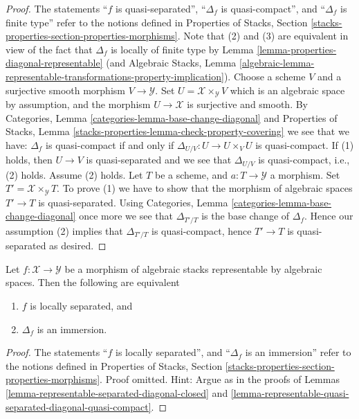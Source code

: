 \begin{proof}
The statements
``$f$ is quasi-separated'',
``$\Delta_f$ is quasi-compact'', and
``$\Delta_f$ is finite type''
refer to the notions defined in
Properties of Stacks,
Section \ref{stacks-properties-section-properties-morphisms}.
Note that (2) and (3) are equivalent in view of the fact that
$\Delta_f$ is locally of finite type by
Lemma \ref{lemma-properties-diagonal-representable}
(and
Algebraic Stacks, Lemma
\ref{algebraic-lemma-representable-transformations-property-implication}).
Choose a scheme $V$ and a surjective smooth morphism $V \to \mathcal{Y}$.
Set $U = \mathcal{X} \times_\mathcal{Y} V$ which is an algebraic
space by assumption, and the morphism $U \to \mathcal{X}$ is surjective
and smooth. By
Categories, Lemma \ref{categories-lemma-base-change-diagonal}
and
Properties of Stacks,
Lemma \ref{stacks-properties-lemma-check-property-covering}
we see that we have: $\Delta_f$ is quasi-compact if and only if
$\Delta_{U/V} : U \to  U \times_V U$ is quasi-compact.
If (1) holds, then $U \to V$ is quasi-separated and we see that
$\Delta_{U/V}$ is quasi-compact, i.e., (2) holds.
Assume (2) holds. Let $T$ be a scheme, and $a : T \to \mathcal{Y}$
a morphism. Set $T' = \mathcal{X} \times_\mathcal{Y} T$. To prove
(1) we have to show that the morphism of algebraic spaces $T' \to T$
is quasi-separated. Using
Categories, Lemma \ref{categories-lemma-base-change-diagonal}
once more we see that $\Delta_{T'/T}$ is the base change of
$\Delta_f$. Hence our assumption (2) implies that $\Delta_{T'/T}$
is quasi-compact, hence $T' \to T$ is quasi-separated as desired.
\end{proof}

\begin{lemma}
\label{lemma-representable-locally-separated-diagonal-immersion}
Let $f : \mathcal{X} \to \mathcal{Y}$ be a morphism of algebraic stacks
representable by algebraic spaces. Then the following are equivalent
\begin{enumerate}
\item $f$ is locally separated, and
\item $\Delta_f$ is an immersion.
\end{enumerate}
\end{lemma}

\begin{proof}
The statements ``$f$ is locally separated'', and ``$\Delta_f$ is an immersion''
refer to the notions defined in
Properties of Stacks,
Section \ref{stacks-properties-section-properties-morphisms}.
Proof omitted. Hint: Argue as in the proofs of
Lemmas \ref{lemma-representable-separated-diagonal-closed} and
\ref{lemma-representable-quasi-separated-diagonal-quasi-compact}.
\end{proof}






